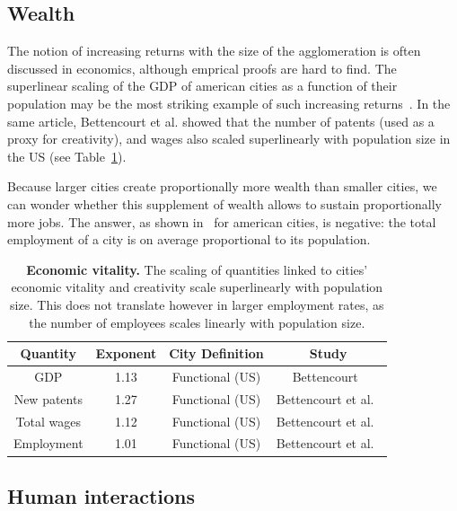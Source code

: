 \subsection{Wealth}
\label{sub:wealth}

The notion of increasing returns with the size of the agglomeration is
often discussed in economics, although emprical proofs are hard to find. The
superlinear scaling of the GDP of american cities as a function of their
population may be the most striking example of such increasing
returns~\cite{Bettencourt:2007}. In the same article, Bettencourt et al. showed
that the number of patents (used as a proxy for creativity), and wages also scaled
superlinearly with population size in the US (see Table~\ref{tab:wealth}).

Because larger cities create proportionally more wealth than smaller cities, we
can wonder whether this supplement of wealth allows to sustain proportionally
more jobs. The answer, as shown in~\cite{Bettencourt:2014} for american cities,
is negative: the total employment of a city is on average proportional to its population.

\begin{table}[!h]
    \centering
\begin{tabular}{|cccc|}
\hline
Quantity & Exponent & City Definition & Study\\
\hline
GDP & 1.13 & Functional (US) & Bettencourt~\cite{Bettencourt:2013}\\
New patents & 1.27 & Functional (US) & Bettencourt et al.~\cite{Bettencourt:2007}\\ 
Total wages & 1.12 & Functional (US) & Bettencourt et al.~\cite{Bettencourt:2007}\\
\hline
Employment & 1.01 & Functional (US) & Bettencourt et
al.~\cite{Bettencourt:2007}\\
\hline
\end{tabular}
\caption{{\bf Economic vitality.} The scaling of quantities linked to cities'
economic vitality and creativity scale superlinearly with population size.
This does not translate however in larger employment rates, as the number of
employees scales linearly with population size.} 
\label{tab:wealth} 
\end{table}

\subsection{Human interactions}
\label{sub:human_interactions}

